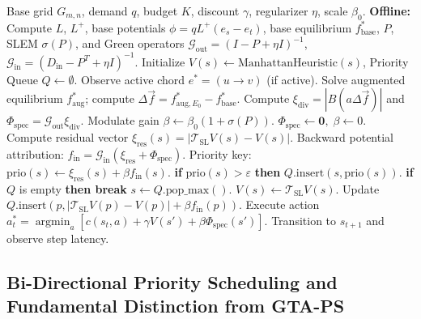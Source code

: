 \documentclass[11pt,a4paper]{article}
\begin{document}
\begin{algorithm}[t]
\caption{Spectral-Laplacian Prioritized Sweeping (SL-PS)}
\label{alg:sl_ps}
\begin{algorithmic}[1]
\REQUIRE Base grid $G_{m,n}$, demand $q$, budget $K$, discount $\gamma$, regularizer $\eta$, scale $\beta_0$.
\STATE \textbf{Offline:} Compute $L$, $L^+$, base potentials $\phi = q L^+ (e_s - e_t)$, base equilibrium $f_{\text{base}}^*$, $P$, SLEM $\sigma(P)$, and Green operators $\mathcal{G}_{\text{out}} = (I - P + \eta I)^{-1}$, $\mathcal{G}_{\text{in}} = (D_{\text{in}} - P^T + \eta I)^{-1}$.
\STATE Initialize $V(s) \leftarrow \text{ManhattanHeuristic}(s)$, Priority Queue $Q \leftarrow \emptyset$.
    \STATE Observe active chord $e^* = (u \to v)$ (if active).
        \STATE Solve augmented equilibrium $f_{\text{aug}}^*$; compute $\Delta \vec{f} = f_{\text{aug}, E_0}^* - f_{\text{base}}^*$.
        \STATE Compute $\xi_{\text{div}} = |B (a \Delta \vec{f})|$ and $\Phi_{\text{spec}} = \mathcal{G}_{\text{out}} \xi_{\text{div}}$.
        \STATE Modulate gain $\beta \leftarrow \beta_0 (1 + \sigma(P))$.
    \ELSE
        \STATE $\Phi_{\text{spec}} \leftarrow \mathbf{0}, \; \beta \leftarrow 0$.
    \ENDIF
    \STATE Compute residual vector $\xi_{\text{res}}(s) = |\mathcal{T}_{\text{SL}} V(s) - V(s)|$.
    \STATE Backward potential attribution: $f_{\text{in}} = \mathcal{G}_{\text{in}} (\xi_{\text{res}} + \Phi_{\text{spec}})$.
        \STATE Priority key: $\text{prio}(s) \leftarrow \xi_{\text{res}}(s) + \beta f_{\text{in}}(s)$.
        \STATE \textbf{if} $\text{prio}(s) > \varepsilon$ \textbf{then} $Q.\text{insert}(s, \text{prio}(s))$.
    \ENDFOR
        \STATE \textbf{if} $Q$ is empty \textbf{then break}
        \STATE $s \leftarrow Q.\text{pop\_max}()$.
        \STATE $V(s) \leftarrow \mathcal{T}_{\text{SL}} V(s)$.
            \STATE Update $Q.\text{insert}(p, |\mathcal{T}_{\text{SL}} V(p) - V(p)| + \beta f_{\text{in}}(p))$.
        \ENDFOR
    \ENDFOR
    \STATE Execute action $a_t^* = \operatorname{argmin}_a [ c(s_t, a) + \gamma V(s') + \beta \Phi_{\text{spec}}(s') ]$.
    \STATE Transition to $s_{t+1}$ and observe step latency.
\ENDFOR
\end{algorithmic}
\end{algorithm}

\subsection{Bi-Directional Priority Scheduling and Fundamental Distinction from GTA-PS}
\label{sec:priority_scheduling}
\end{document}
